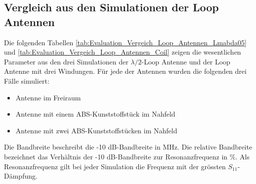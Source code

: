 



\newpage
\subsection{Vergleich aus den Simulationen der Loop Antennen}
Die folgenden Tabellen \ref{tab:Evaluation_Vergeich_Loop_Antennen_Lmabda05} und \ref{tab:Evaluation_Vergeich_Loop_Antennen_Coil} zeigen die wesentlichen Parameter aus den drei Simulationen der $\lambda/2$-Loop Antenne und der Loop Antenne mit drei Windungen. Für jede der Antennen wurden die folgenden drei Fälle simuliert:
\begin{itemize}
\item Antenne im Freiraum
\item Antenne mit einem ABS-Kunststoffstück im Nahfeld
\item Antenne mit zwei ABS-Kunststoffstücken im Nahfeld
\end{itemize}
Die Bandbreite beschreibt die -10 dB-Bandbreite in MHz. Die relative Bandbreite bezeichnet das Verhältnis der -10 dB-Bandbreite zur Resonanzfrequenz in $\%$. Als Resonanzfrequenz gilt bei jeder Simulation die Frequenz mit der grössten $S_{11}$-Dämpfung.\\

